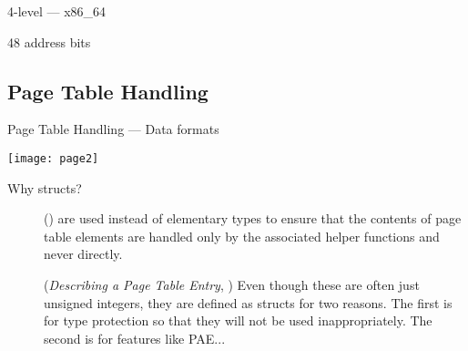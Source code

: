 \begin{frame}{4-level --- x86\_64}
  \begin{block}{48 address bits}
    \begin{center}
    \end{center}
  \end{block}
  \begin{block}{}
    \begin{center}
    \end{center}
  \end{block}
\end{frame}

\subsection{Page Table Handling}
\label{sec:page-table-handling}

\begin{frame}{Page Table Handling}{ --- Data formats}
  \begin{block}{}
    \texttt{[image: page2]}
  \end{block}
\end{frame}

\begin{description}
\item[Why structs?] (\cite[p158]{mauerer2008professional})  are used
  instead of elementary types to ensure that the contents of page table elements are
  handled only by the associated helper functions and never directly.
  
  (\emph{Describing a Page Table Entry}, \cite[Sec 3.2]{gorman2004understanding}) Even
  though these are often just unsigned integers, they are defined as structs for two
  reasons. The first is for type protection so that they will not be used
  inappropriately. The second is for features like PAE...
\end{description}

